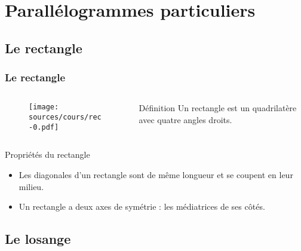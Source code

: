 \documentclass{beamer}
\begin{document}
\section{Parallélogrammes particuliers}

\subsection{Le rectangle}

\begin{frame}
  \frametitle{Le rectangle}
  
  \begin{columns}[t]
    \begin{column}{4cm}
      \begin{block}{}	
        \begin{figure}[H]
          \centering
          \texttt{[image: sources/cours/rec-0.pdf]}
        \end{figure}
      \end{block} 
    \end{column}
    \begin{column}{6cm}
      \begin{alertblock}{Définition}	
	Un rectangle est un quadrilatère avec quatre angles droits.
      \end{alertblock}
    \end{column}
  \end{columns} 
  
  \begin{block}{Propriétés du rectangle}	
    \begin{itemize}
    \item Les diagonales d'un rectangle sont de même longueur et se coupent en leur milieu.
    \item Un rectangle a deux axes de symétrie : les médiatrices de ses côtés.
    \end{itemize}
  \end{block} 
  
\end{frame}

\subsection{Le losange}
\end{document}
